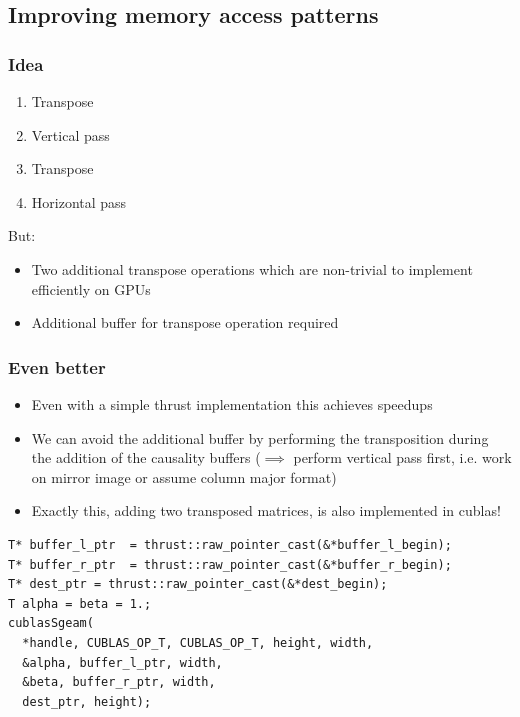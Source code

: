 \documentclass{beamer}
\begin{document}
\subsection{Improving memory access patterns}
\begin{frame}[fragile]
  \frametitle{Idea}
  \begin{enumerate}
    \item Transpose
    \item Vertical pass
    \item Transpose
    \item Horizontal pass
  \end{enumerate}
  But:
  \begin{itemize}
    \item Two additional transpose operations which are non-trivial to
      implement efficiently on GPUs
    \item Additional buffer for transpose operation required
  \end{itemize}
\end{frame}

\begin{frame}[fragile]
  \frametitle{Even better}
  \begin{itemize}
    \item Even with a simple thrust implementation this achieves speedups
    \item We can avoid the additional buffer by performing the transposition
      during the addition of the causality buffers ($\implies$ perform
      vertical pass first, i.e. work on mirror image or assume column major
      format)
    \item Exactly this, adding two transposed matrices, is also implemented
      in cublas!
  \end{itemize}
  \begin{lstlisting}[basicstyle=\tiny]
T* buffer_l_ptr  = thrust::raw_pointer_cast(&*buffer_l_begin);
T* buffer_r_ptr  = thrust::raw_pointer_cast(&*buffer_r_begin);
T* dest_ptr = thrust::raw_pointer_cast(&*dest_begin);
T alpha = beta = 1.;
cublasSgeam(
  *handle, CUBLAS_OP_T, CUBLAS_OP_T, height, width,
  &alpha, buffer_l_ptr, width,
  &beta, buffer_r_ptr, width,
  dest_ptr, height);
  \end{lstlisting}
\end{frame}
\end{document}
